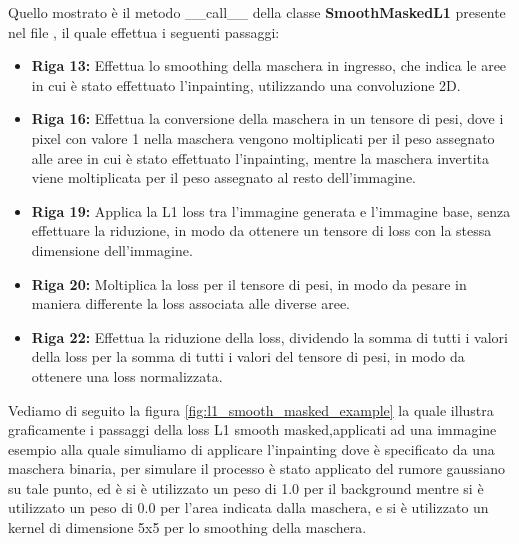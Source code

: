 Quello mostrato è il metodo \_\_call\_\_ della classe \textbf{SmoothMaskedL1} presente nel file ,
il quale effettua i seguenti passaggi:

\begin{itemize}
    \item \textbf{Riga 13:} Effettua lo smoothing della maschera in ingresso, che indica le aree in cui è stato effettuato l'inpainting, utilizzando una convoluzione 2D.
    \item \textbf{Riga 16:} Effettua la conversione della maschera in un tensore di pesi, dove i pixel con valore 1 nella maschera vengono moltiplicati per il peso
        assegnato alle aree in cui è stato effettuato l'inpainting, mentre la maschera invertita viene moltiplicata per il peso assegnato al resto dell'immagine.
    \item \textbf{Riga 19:} Applica la L1 loss tra l'immagine generata e l'immagine base, senza effettuare la riduzione, in modo da ottenere un tensore di loss
        con la stessa dimensione dell'immagine.
    \item \textbf{Riga 20:} Moltiplica la loss per il tensore di pesi, in modo da pesare in maniera differente la loss associata alle diverse aree.
    \item \textbf{Riga 22:} Effettua la riduzione della loss, dividendo la somma di tutti i valori della loss per la somma di tutti i valori del tensore di pesi,
        in modo da ottenere una loss normalizzata.
\end{itemize}

Vediamo di seguito la figura \ref{fig:l1_smooth_masked_example} la quale illustra graficamente i passaggi della loss L1 smooth masked,applicati ad una immagine 
esempio alla quale simuliamo di applicare l'inpainting dove è specificato da una maschera binaria, per simulare il processo è stato applicato del rumore gaussiano
su tale punto, ed è si è utilizzato un peso di 1.0 per il background mentre si è utilizzato un peso di 0.0 per l'area indicata dalla maschera, e si è utilizzato un
kernel di dimensione 5x5 per lo smoothing della maschera.

